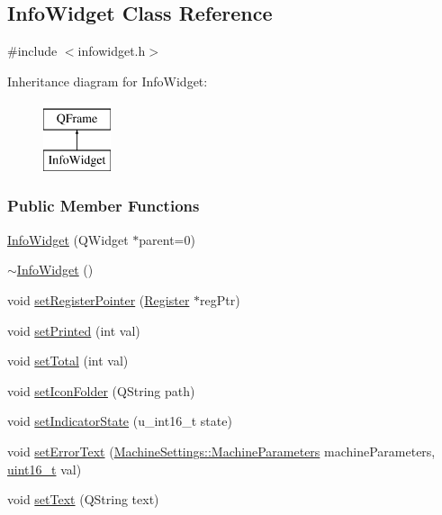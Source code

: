 \hypertarget{classInfoWidget}{}\subsection{Info\+Widget Class Reference}
\label{classInfoWidget}


{\ttfamily \#include $<$infowidget.\+h$>$}

Inheritance diagram for Info\+Widget\+:\begin{figure}[H]
\begin{center}
\leavevmode
\includegraphics[height=2.000000cm]{classInfoWidget}
\end{center}
\end{figure}
\subsubsection*{Public Member Functions}
\begin{DoxyCompactItemize}
\item 
\mbox{\hyperlink{classInfoWidget_a19f07d861d22be4881361a5a32e86451}{Info\+Widget}} (Q\+Widget $\ast$parent=0)
\item 
\mbox{\hyperlink{classInfoWidget_aefa39a20c91f6dbc8cbc0b6d9bf7623e}{$\sim$\+Info\+Widget}} ()
\item 
void \mbox{\hyperlink{classInfoWidget_a36d29faf6a45282ca2b46ca53de0be19}{set\+Register\+Pointer}} (\mbox{\hyperlink{classRegister}{Register}} $\ast$reg\+Ptr)
\item 
void \mbox{\hyperlink{classInfoWidget_a8a4f1e9fea6f1a9794dffbb264fa7455}{set\+Printed}} (int val)
\item 
void \mbox{\hyperlink{classInfoWidget_a550b6f54475eb5adfba33b4b5f69c6bb}{set\+Total}} (int val)
\item 
void \mbox{\hyperlink{classInfoWidget_a3ff137f58223343fa7ae5b09218a0185}{set\+Icon\+Folder}} (Q\+String path)
\item 
void \mbox{\hyperlink{classInfoWidget_a78af7f055dbb07026ecf1c820b0381bb}{set\+Indicator\+State}} (u\+\_\+int16\+\_\+t state)
\item 
void \mbox{\hyperlink{classInfoWidget_ab17f6cd1820b6946d72c6a42ea3f914b}{set\+Error\+Text}} (\mbox{\hyperlink{classMachineSettings_a87879e13793dbc7c10d4fa18e1236751}{Machine\+Settings\+::\+Machine\+Parameters}} machine\+Parameters, \mbox{\hyperlink{settings_8h_a017dd44e68049ffdd31500a8cd01ba68}{uint16\+\_\+t}} val)
\item 
void \mbox{\hyperlink{classInfoWidget_a1131ca67076ad6951cd2636a7e4e1c7e}{set\+Text}} (Q\+String text)
\end{DoxyCompactItemize}
